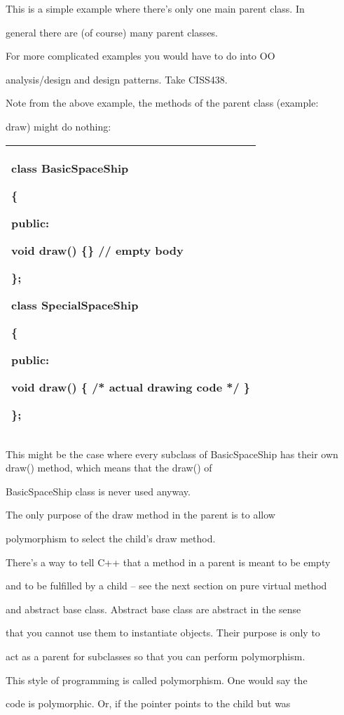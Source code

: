 \documentclass[
]{article}
\begin{document}
This is a simple example where there's only one main parent class. In

general there are (of course) many parent classes.

For more complicated examples you would have to do into OO

analysis/design and design patterns. Take CISS438.

Note from the above example, the methods of the parent class (example:

draw) might do nothing:

\begin{longtable}[]{@{}l@{}}
\toprule
\endhead
\begin{minipage}[t]{0.97\columnwidth}\raggedright
class BasicSpaceShip

\{

public:

void draw() \{\} // empty body

\};

class SpecialSpaceShip

\{

public:

void draw() \{ /* actual drawing code */ \}

\};\strut
\end{minipage}\tabularnewline
\bottomrule
\end{longtable}

This might be the case where every subclass of BasicSpaceShip has their
own draw() method, which means that the draw() of

BasicSpaceShip class is never used anyway.

The only purpose of the draw method in the parent is to allow

polymorphism to select the child's draw method.

There's a way to tell C++ that a method in a parent is meant to be empty

and to be fulfilled by a child -- see the next section on pure virtual
method

and abstract base class. Abstract base class are abstract in the sense

that you cannot use them to instantiate objects. Their purpose is only
to

act as a parent for subclasses so that you can perform polymorphism.

This style of programming is called polymorphism. One would say the

code is polymorphic. Or, if the pointer points to the child but was
\end{document}
